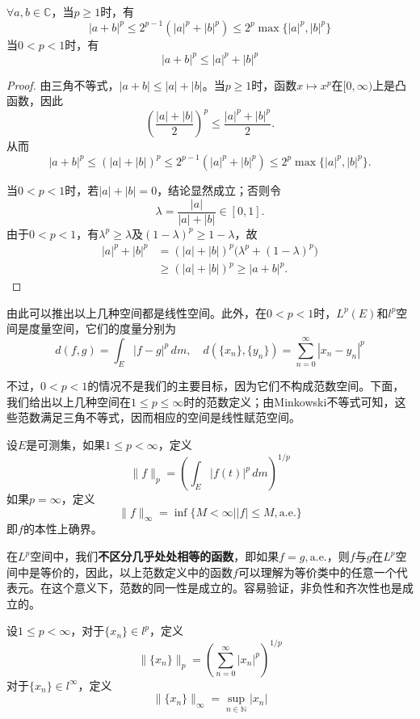 \begin{lemma}
    $\forall a,b\in\mathbb{C}$，当$p\geq 1$时，有
    \[|a+b|^p\leq 2^{p-1}(|a|^p+|b|^p)\leq 2^p\max\{|a|^p,|b|^p\}\]
    当$0<p<1$时，有
    \[|a+b|^p\leq |a|^p+|b|^p\]
\end{lemma}
\begin{proof}
    由三角不等式，$|a+b|\leq |a|+|b|$。当$p\geq 1$时，函数$x\mapsto x^p$在$[0,\infty)$上是凸函数，因此
    \[\left(\frac{|a|+|b|}{2}\right)^p\leq \frac{|a|^p+|b|^p}{2}.\]
    从而
    \[|a+b|^p\leq (|a|+|b|)^p\leq 2^{p-1}(|a|^p+|b|^p)\leq 2^p\max\{|a|^p,|b|^p\}.\]

    当$0<p<1$时，若$|a|+|b|=0$，结论显然成立；否则令
    \[\lambda=\frac{|a|}{|a|+|b|}\in[0,1].\]
    由于$0<p<1$，有$\lambda^p\geq\lambda$及$(1-\lambda)^p\geq 1-\lambda$，故
    \begin{align*}
        |a|^p+|b|^p
        &=(|a|+|b|)^p\bigl(\lambda^p+(1-\lambda)^p\bigr)\\
        &\geq (|a|+|b|)^p
        \geq |a+b|^p.
    \end{align*}
\end{proof}

由此可以推出以上几种空间都是线性空间。此外，在$0<p<1$时，$L^p(E)$和$l^p$空间是度量空间，它们的度量分别为
\[d(f,g)=\int_{E}|f-g|^p\,dm,\quad d(\{x_n\},\{y_n\})=\sum_{n=0}^{\infty}|x_n-y_n|^p\]

不过，$0<p<1$的情况不是我们的主要目标，因为它们不构成范数空间。下面，我们给出以上几种空间在$1\leq p \leq \infty$时的范数定义；由Minkowski不等式可知，这些范数满足三角不等式，因而相应的空间是线性赋范空间。

\begin{definition}[$L^p$空间的范数]
    设$E$是可测集，如果$1\leq p<\infty$，定义
    \[\|f\|_p=\left(\int_{E}|f(t)|^p\,dm\right)^{1/p}\]
    如果$p=\infty$，定义
    \[\|f\|_{\infty}=\inf\{M<\infty||f|\leq M,\mathrm{a.e.}\}\]
    即$f$的本性上确界。
\end{definition}

在$L^p$空间中，我们\textbf{不区分几乎处处相等的函数}，即如果$f=g,\mathrm{a.e.}$，则$f$与$g$在$L^p$空间中是等价的，因此，以上范数定义中的函数$f$可以理解为等价类中的任意一个代表元。在这个意义下，范数的同一性是成立的。容易验证，非负性和齐次性也是成立的。

\begin{definition}[$l^p$空间的范数]
    设$1\leq p<\infty$，对于$\{x_n\}\in l^p$，定义
    \[\|\{x_n\}\|_p=\left(\sum_{n=0}^{\infty}|x_n|^p\right)^{1/p}\]
    对于$\{x_n\}\in l^{\infty}$，定义
    \[\|\{x_n\}\|_{\infty}=\sup_{n\in \mathbb{N}}|x_n|\]
\end{definition}

